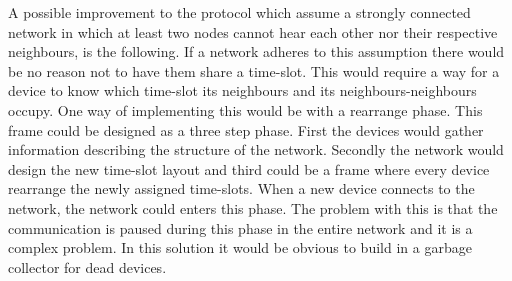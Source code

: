 A possible improvement to the protocol which assume a strongly connected network in which at least two nodes cannot hear each other nor their respective neighbours, is the following.
If a network adheres to this assumption there would be no reason not to have them share a time-slot.
This would require a way for a device to know which time-slot its neighbours and its neighbours-neighbours occupy.
One way of implementing this would be with a rearrange phase.
This frame could be designed as a three step phase. 
First the devices would gather information describing the structure of the network.
Secondly the network would design the new time-slot layout and third could be a frame where every device rearrange the newly assigned time-slots.
When a new device connects to the network, the network could enters this phase.
The problem with this is that the communication is paused during this phase in the entire network and it is a complex problem.
In this solution it would be obvious to build in a garbage collector for dead devices.